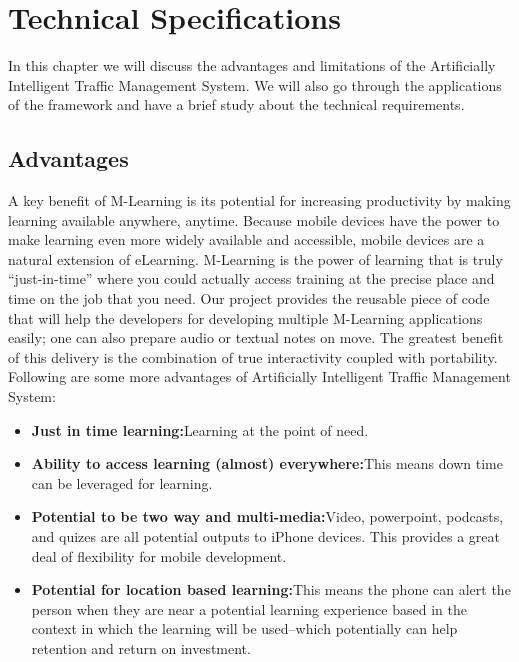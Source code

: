 \documentclass[openany,12pt]{report}
\begin{document}
\chapter{Technical Specifications}
\hspace*{0.5in}In this chapter we will discuss the advantages and limitations of the Artificially Intelligent Traffic Management System. We will also go through the applications of the framework and have a brief study about the technical requirements.
\section{Advantages}
\hspace*{0.5in}A key benefit of M-Learning is its potential for increasing productivity by making learning available anywhere, anytime. Because mobile devices have the power to make learning even more widely available and accessible, mobile devices are a natural extension of eLearning. M-Learning is the power of learning that is truly “just-in-time” where you could actually access training at the precise place and time on the job that you need. Our project provides the reusable piece of code that will help the developers for developing multiple M-Learning applications easily; one can also prepare audio or textual notes on move. The greatest benefit of this delivery is the combination of true interactivity coupled with portability.
\\Following are some more advantages of Artificially Intelligent Traffic Management System:
\begin{itemize}
\item{\textbf{Just in time learning:}Learning at the point of need.}
\item{\textbf{Ability to access learning (almost) everywhere:}This means down time can be leveraged for learning.}
\item{\textbf{Potential to be two way and multi-media:}Video, powerpoint, podcasts, and quizes are all potential outputs to iPhone devices. This provides a great deal of flexibility for mobile development.}
\item{\textbf{Potential for location based learning:}This means the phone can alert the person when they are near a potential learning experience based in the context in which the learning will be used–which potentially can help retention and return on investment.}
\end{itemize}
\end{document}
